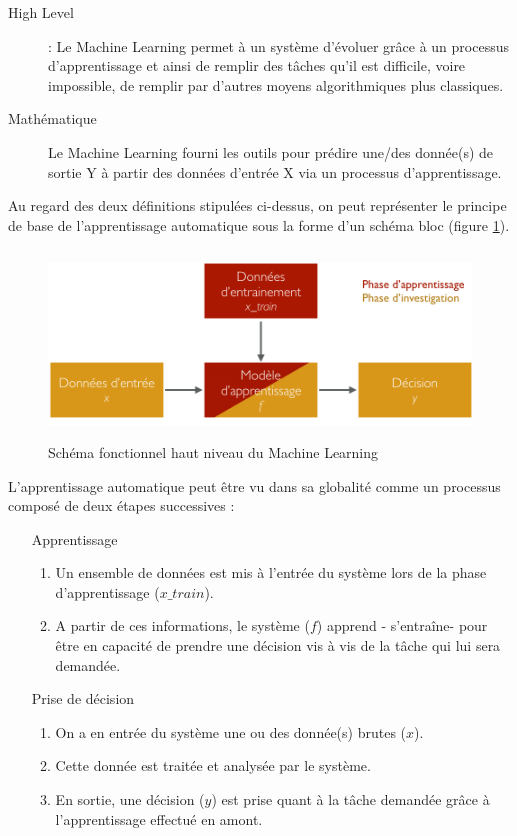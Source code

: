 \begin{description}
	\item[High Level]: Le Machine Learning permet à un système d'évoluer grâce à un processus d'apprentissage et ainsi de remplir des tâches qu'il est difficile, voire impossible, de remplir par d'autres moyens algorithmiques plus classiques. 
	\item[Mathématique] Le Machine Learning fourni les outils pour prédire une/des donnée(s) de sortie Y à partir des données d'entrée X via un processus d'apprentissage. 
\end{description}
 
Au regard des deux définitions stipulées ci-dessus, on peut représenter le principe de base de l'apprentissage automatique sous la forme d'un schéma bloc (figure \ref{fig:Schéma fonctionnel haut niveau du Machine Learning}).

\begin{figure}[h]
	\centering\includegraphics[height=5cm]{images/ML_high_level.png}
	\caption{Schéma fonctionnel haut niveau du Machine Learning}
	\label{fig:Schéma fonctionnel haut niveau du Machine Learning}
\end{figure}

L'apprentissage automatique peut être vu dans sa globalité comme un processus composé de deux étapes successives : 
\begin{enumerate}
		\item [Apprentissage]
		 \begin{enumerate}
			\item  Un ensemble de données est mis à l'entrée du système lors de la phase d'apprentissage ($x\_train$).
			\item A partir de ces informations, le système ($f$) apprend - s'entraîne- pour être en capacité de prendre une décision vis à vis de la tâche qui lui sera demandée. 
		\end{enumerate}
		
		\item [Prise de décision] 
		\begin{enumerate}
			\item  On a en entrée du système une ou des donnée(s) brutes ($x$).  
			\item Cette donnée est traitée et analysée par le système.
			\item En sortie, une décision ($y$) est prise quant à la tâche demandée grâce à l'apprentissage effectué en amont. 
		\end{enumerate}
\end{enumerate}


